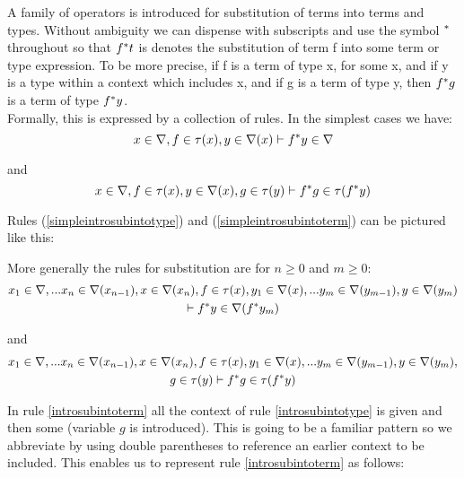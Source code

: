 \documentclass[10pt,a4paper]{article}
\begin{document}
\noindent A family of operators is introduced for substitution of terms into terms and types. Without ambiguity we can dispense with subscripts and use the symbol $^*$ throughout so that $f ^* t$ is denotes the substitution of term f into some term or type expression. To be more precise, if f is a term of type x, for some x, and if y is a type within a context which includes x, and if g is a term of type y, then $f^* g$ is a term of type $f ^* y$. \\

\noindent Formally, this is expressed by a collection of rules. In the simplest cases we have:
\begin{equation}
\label{simpleintrosubintotype}
x \in \nabla, f \in \tau(x), y \in \nabla(x)
\vdash
f ^* y \in \nabla
\end{equation}
\vspace{0cm}

\noindent and
\begin{equation}
\label{simpleintrosubintoterm}
x \in \nabla, f \in \tau(x), y \in \nabla(x), g \in \tau(y)
\vdash
f ^* g \in \tau(f ^* y)
\end{equation}
\vspace{0cm}

\noindent Rules (\ref{simpleintrosubintotype}) and (\ref{simpleintrosubintoterm}) can be pictured like this:


\noindent More generally the rules for substitution are for $n \ge 0$ and $m \ge 0$:
\begin{multline}
\label{introsubintotype}
x_1 \in \nabla,... x_{n} \in \nabla(x_{n-1}), x \in \nabla(x_n), f \in \tau(x),
y_1 \in \nabla({x}),... y_{m} \in \nabla(y_{m-1}), 
 y \in \nabla(y_m) \\
\vdash
f ^* y \in \nabla(f ^* y_{m})
\end{multline}


\noindent and
\begin{multline}
\label{introsubintoterm}
x_1 \in \nabla,... x_{n} \in \nabla(x_{n-1}), x \in \nabla(x_n), f \in \tau(x),
y_1 \in \nabla({x}),... y_{m} \in \nabla(y_{m-1}), y \in \nabla(y_m),\\
g \in \tau(y) 
\vdash
f ^* g \in \tau(f ^* y) 
\end{multline}

\newcommand{\contextof}[1]{
((\ref{#1}))
}

\noindent In rule \ref{introsubintoterm} all the context of rule \ref{introsubintotype}
is given and then some (variable $g$ is introduced). This is going to be a familiar pattern so we abbreviate by using double parentheses to reference an earlier context to be included. This enables us to represent rule   
\ref{introsubintoterm} as follows:
\end{document}
